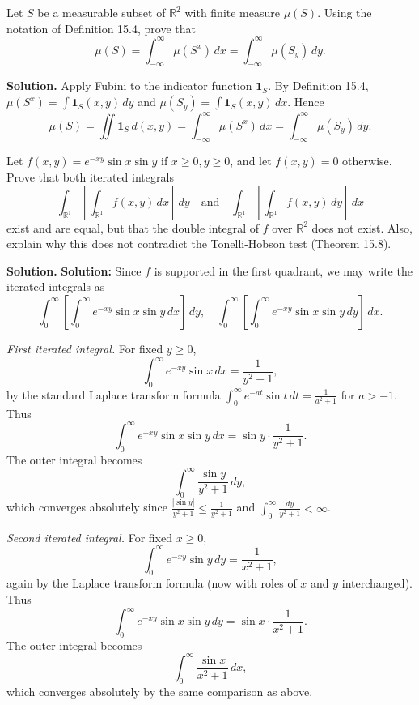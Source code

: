 \begin{problembox}
Let \( S \) be a measurable subset of \( \mathbb{R}^2 \) with finite measure \( \mu(S) \). Using the notation of Definition 15.4, prove that
\[
\mu(S) = \int_{-\infty}^{\infty} \mu(S^x) \, dx = \int_{-\infty}^{\infty} \mu(S_y) \, dy.
\]
\end{problembox}

\noindent\textbf{Solution.}
Apply Fubini to the indicator function \(\mathbf{1}_S\). By Definition 15.4, \(\mu(S^x)=\int \mathbf{1}_S(x,y)\,dy\) and \(\mu(S_y)=\int \mathbf{1}_S(x,y)\,dx\). Hence
\[
\mu(S)=\iint \mathbf{1}_S\,d(x,y)=\int_{-\infty}^{\infty}\!\mu(S^x)\,dx=\int_{-\infty}^{\infty}\!\mu(S_y)\,dy.
\]

\begin{problembox}
Let \( f(x, y) = e^{-xy} \sin x \sin y \) if \( x \geq 0, y \geq 0 \), and let \( f(x, y) = 0 \) otherwise. Prove that both iterated integrals
\[
\int_{\mathbb{R}^1} \left[ \int_{\mathbb{R}^1} f(x, y) \, dx \right] \, dy \quad \text{and} \quad \int_{\mathbb{R}^1} \left[ \int_{\mathbb{R}^1} f(x, y) \, dy \right] \, dx
\]
exist and are equal, but that the double integral of \( f \) over \( \mathbb{R}^2 \) does not exist. Also, explain why this does not contradict the Tonelli-Hobson test (Theorem 15.8).
\end{problembox}

\noindent\textbf{Solution.}
\textbf{Solution:}
Since \(f\) is supported in the first quadrant, we may write the iterated integrals as
\[
\int_0^\infty \left[ \int_0^\infty e^{-xy} \sin x \sin y \, dx \right] \, dy,
\quad
\int_0^\infty \left[ \int_0^\infty e^{-xy} \sin x \sin y \, dy \right] \, dx.
\]

\emph{First iterated integral.}
For fixed \(y \ge 0\),
\[
\int_0^\infty e^{-xy} \sin x \, dx
= \frac{1}{y^2+1},
\]
by the standard Laplace transform formula 
\(\int_0^\infty e^{-at} \sin t\, dt = \frac{1}{a^2+1}\) for \(a > -1\).
Thus
\[
\int_0^\infty e^{-xy} \sin x \sin y \, dx
= \sin y \cdot \frac{1}{y^2+1}.
\]
The outer integral becomes
\[
\int_0^\infty \frac{\sin y}{y^2+1} \, dy,
\]
which converges absolutely since \(\frac{|\sin y|}{y^2+1} \le \frac{1}{y^2+1}\) and \(\int_0^\infty \frac{dy}{y^2+1} < \infty\).

\emph{Second iterated integral.}
For fixed \(x \ge 0\),
\[
\int_0^\infty e^{-xy} \sin y \, dy
= \frac{1}{x^2+1},
\]
again by the Laplace transform formula (now with roles of \(x\) and \(y\) interchanged).
Thus
\[
\int_0^\infty e^{-xy} \sin x \sin y \, dy
= \sin x \cdot \frac{1}{x^2+1}.
\]
The outer integral becomes
\[
\int_0^\infty \frac{\sin x}{x^2+1} \, dx,
\]
which converges absolutely by the same comparison as above.  

